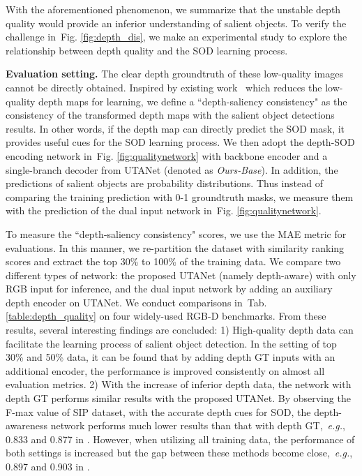 \documentclass[journal]{IEEEtran}
\def\eg{{\em e.g.}}
\newcommand{\figref}[1]{Fig. \ref{#1}}
\newcommand{\tabref}[1]{Tab. \ref{#1}}
\begin{document}
With the aforementioned phenomenon, we summarize that the unstable depth quality would provide an inferior understanding of salient objects. To verify the challenge in~\figref{fig:depth_dis}, we make an experimental study to explore the relationship between depth quality and the SOD learning process.


\textbf{Evaluation setting.} The clear depth groundtruth of these low-quality images cannot be directly obtained. Inspired by existing work~\cite{fan2019D3Net} which reduces the low-quality depth maps for learning, we define a ``depth-saliency consistency" as the consistency of the transformed depth maps with the salient object detections results. In other words, if the depth map can directly predict the SOD mask, it provides useful cues for the SOD learning process. We then adopt the depth-SOD encoding network in~\figref{fig:qualitynetwork} with backbone encoder and a single-branch decoder from UTANet (denoted as \textit{Ours-Base}). In addition, the predictions of salient objects are probability distributions. Thus instead of comparing the training prediction with 0-1 groundtruth masks, we measure them with the prediction of the dual input network in~\figref{fig:qualitynetwork}.

To measure the ``depth-saliency consistency" scores, we use the MAE metric for evaluations.  In this manner, we re-partition the dataset with similarity ranking scores and extract the top 30\% to 100\% of the training data.  We compare two different types of network: the proposed UTANet (namely depth-aware) with only RGB input for inference, and the dual input network by adding an auxiliary depth encoder on UTANet.
We conduct comparisons in~\tabref{table:depth_quality} on four widely-used RGB-D benchmarks. From these results, several interesting findings are concluded:
1) High-quality depth data can facilitate the learning process of salient object detection. In the setting of top 30\% and 50\% data, it can be found that by adding depth GT inputs with an additional encoder, the performance is improved consistently on almost all evaluation metrics.
2) With the increase of inferior depth data, the network with depth GT performs similar results with the proposed UTANet. By observing the F-max value of SIP dataset, with the accurate depth cues for SOD, the depth-awareness network performs much lower results than that with depth GT,~\eg, 0.833 and 0.877 in . However, when utilizing all training data, the performance of both settings is increased but the gap between these methods become close,~\eg, 0.897 and 0.903 in .
\end{document}
